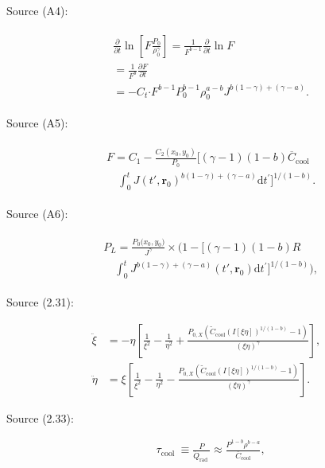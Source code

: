 Source (A4):

\[
\begin{gathered}\textstyle \begin{aligned} & \frac {\partial }{\partial t} \ln \left [F \frac {P_0}{\rho _0^\gamma }\right ]=\frac {1}{F^{b-1}} \frac {\partial }{\partial t} \ln F\\ & =\frac {1}{F^b}\frac {\partial F}{\partial t}\\ & =-C_{t}\boldsymbol{\cdot} F^{b-1} P_0^{b-1} \rho _0^{a-b} J^{b(1-\gamma )+(\gamma -a)}. \end{aligned}\end{gathered}\tag{SA4}
\]

Source (A5):

\[
\begin{gathered}\textstyle \begin{aligned} & F=C_1-\frac {C_2(x_0, y_0)}{P_0}[(\gamma -1)(1-b)\overline {C}_{\text{cool}}\\ &\quad \int _0^t J(t',\boldsymbol{r}_0)^{b(1-\gamma )+(\gamma -a)}\text{d}t^{\prime }]^{1/(1-b)}. \end{aligned}\end{gathered}\tag{SA5}
\]

Source (A6):

\[
\begin{gathered}\textstyle \begin{aligned} & P_L=\frac {P_0\bigl (x_0, y_0\bigr )}{J^\gamma } \times \bigl (1-\bigl [(\gamma -1)(1-b) R\\ &\quad \int _0^t J^{b(1-\gamma )+(\gamma -a)}(t',\boldsymbol{r}_0) \text{d} t^{\prime }\bigr ]^{1 /(1-b)}\bigr )\!, \end{aligned}\end{gathered}\tag{SA6}
\]

Source (2.31):

\[
\begin{aligned} \ddot {\xi } & =-\eta \left [\frac {1}{\xi ^2}-\frac {1}{\eta ^2}+\frac {P_{0,X}(\widetilde {C}_{\text{cool}}\left (I[\xi \eta ]\right )^{{1}/{(1-b)}}-1)}{(\xi \eta )^\gamma }\right ], \\[4pt] \ddot {\eta }& =\xi \left [\frac {1}{\xi ^2}-\frac {1}{\eta ^2}-\frac {P_{0,X}(\widetilde {C}_{\text{cool}}\left (I[\xi \eta ]\right )^{{1}/{(1-b)}}-1)}{(\xi \eta )^\gamma }\right ]. \end{aligned}\tag{S2.31}
\]

Source (2.33):

\[
\begin{aligned} & \tau _{\text{cool }} \equiv \frac {P}{\dot {Q}_{\text{rad }}} \approx \frac {P^{1-b}\rho ^{b-a}}{\overline {C}_{\text{cool}}}, \end{aligned}\tag{S2.33}
\]

